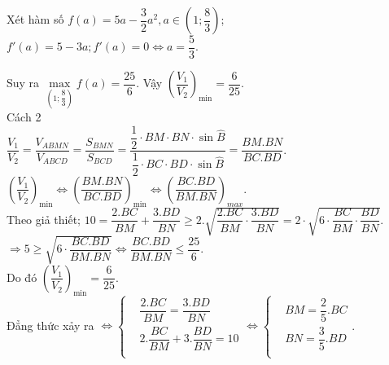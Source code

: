 \begin{ex}
{		Xét hàm số $f(a)=5a-\dfrac{3}{2}{a^2},a\in\left(1;\dfrac{8}{3}\right)$; $ f'(a)=5-3a;f'(a)=0\Leftrightarrow a=\dfrac{5}{3}.$\\
		\begin{center}
		\end{center}
		Suy ra $\underset{\left(1;\dfrac{8}{3}\right)}{\max}f(a)=\dfrac{25}{6}.$
		Vậy $\left(\dfrac{V_1}{V_2}\right)_{\min}=\dfrac{6}{25}.$\\
		Cách 2\\
		$\dfrac{V_1}{V_2}=\dfrac{V_{ABMN}}{V_{ABCD}}=\dfrac{S_{BMN}}{S_{BCD}}=\dfrac{\dfrac{1}{2}\cdot BM\cdot BN\cdot \sin\widehat{B}}{\dfrac{1}{2}\cdot BC\cdot BD\cdot\sin\widehat{B}}=\dfrac{BM.BN}{BC.BD}$.\\
		$\left(\dfrac{V_1}{V_2}\right)_{\min}\Leftrightarrow{\left(\dfrac{BM.BN}{BC.BD}\right)_{\min}}\Leftrightarrow{\left(\dfrac{BC.BD}{BM.BN}\right)_{max}}.$\\
		Theo giả thiết; $ 10=\dfrac{2.BC}{BM}+\dfrac{3.BD}{BN}\ge 2.\sqrt{\dfrac{2.BC}{BM}\cdot\dfrac{3.BD}{BN}}=2\cdot\sqrt{6\cdot\dfrac{BC}{BM}\cdot\dfrac{BD}{BN}}$.\\
		$\Rightarrow 5\ge\sqrt{6\cdot\dfrac{BC.BD}{BM.BN}}\Leftrightarrow\dfrac{BC.BD}{BM.BN}\le\dfrac{25}{6}.$\\
		Do đó $\left(\dfrac{V_1}{V_2}\right)_{\min}=\dfrac{6}{25}.$\\
		Đẳng thức xảy ra $\Leftrightarrow\left\{\begin{aligned}
			&\dfrac{2.BC}{BM}=\dfrac{3.BD}{BN}\\ 
			&2.\dfrac{BC}{BM}+3.\dfrac{BD}{BN}=10\\ 
		\end{aligned}\right.\Leftrightarrow\left\{\begin{aligned}
			&BM=\dfrac{2}{5}.BC\\ 
			&BN=\dfrac{3}{5}.BD\\ 
		\end{aligned}\right.$.
	}
\end{ex}

